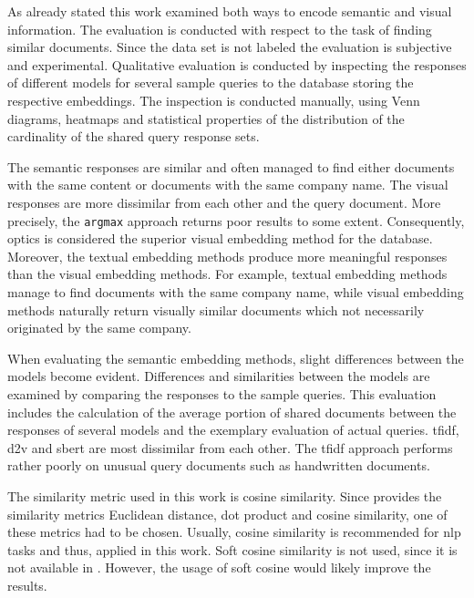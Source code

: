 As already stated this work examined both ways to encode semantic and visual information.
The evaluation is conducted with respect to the task of finding similar documents.
Since the data set is not labeled the evaluation is subjective and experimental.
Qualitative evaluation is conducted by inspecting the responses of different models for several sample queries to the database 
storing the respective embeddings.
The inspection is conducted manually, 
using Venn diagrams, heatmaps and 
statistical properties of the distribution of the cardinality of the shared query response sets.

The semantic responses are similar and often managed to find either documents with the same content or documents with the same company name.
The visual responses are more dissimilar from each other and the query document.
More precisely, the \texttt{argmax} approach returns poor results to some extent.
Consequently, \ac{optics} is considered the superior visual embedding method for the database.
Moreover, the textual embedding methods produce more meaningful responses than the visual embedding methods.
For example, textual embedding methods manage to find documents with the same company name, 
while visual embedding methods naturally return visually similar documents which not necessarily originated by the same company.


When evaluating the semantic embedding methods, slight differences between the models become evident.
Differences and similarities between the models are examined by comparing the responses to the sample queries.
This evaluation includes the calculation of the average portion of shared documents between the responses of several models 
and the exemplary evaluation of actual queries.
\ac{tfidf}, \ac{d2v} and \ac{sbert} are most dissimilar from each other.
The \ac{tfidf} approach performs rather poorly on unusual query documents such as handwritten documents.


The similarity metric used in this work is cosine similarity.
Since \databaseName{} provides the similarity metrics Euclidean distance, dot product and cosine similarity,
one of these metrics had to be chosen.
Usually, cosine similarity is recommended for \ac{nlp} tasks and thus, applied in this work.
Soft cosine similarity is not used, since it is not available in \databaseName{}.
However, the usage of soft cosine would likely improve the results.


